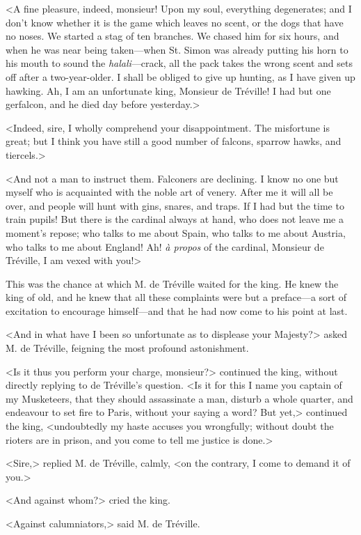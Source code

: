 <A fine pleasure, indeed, monsieur! Upon my soul, everything degenerates; and I don't know whether it is the game which leaves no scent, or the dogs that have no noses. We started a stag of ten branches. We chased him for six hours, and when he was near being taken---when St. Simon was already putting his horn to his mouth to sound the \textit{halali}---crack, all the pack takes the wrong scent and sets off after a two-year-older. I shall be obliged to give up hunting, as I have given up hawking. Ah, I am an unfortunate king, Monsieur de Tréville! I had but one gerfalcon, and he died day before yesterday.> 

<Indeed, sire, I wholly comprehend your disappointment. The misfortune is great; but I think you have still a good number of falcons, sparrow hawks, and tiercels.> 

<And not a man to instruct them. Falconers are declining. I know no one but myself who is acquainted with the noble art of venery. After me it will all be over, and people will hunt with gins, snares, and traps. If I had but the time to train pupils! But there is the cardinal always at hand, who does not leave me a moment's repose; who talks to me about Spain, who talks to me about Austria, who talks to me about England! Ah! \textit{à propos} of the cardinal, Monsieur de Tréville, I am vexed with you!> 

This was the chance at which M. de Tréville waited for the king. He knew the king of old, and he knew that all these complaints were but a preface---a sort of excitation to encourage himself---and that he had now come to his point at last. 

<And in what have I been so unfortunate as to displease your Majesty?> asked M. de Tréville, feigning the most profound astonishment. 

<Is it thus you perform your charge, monsieur?> continued the king, without directly replying to de Tréville's question. <Is it for this I name you captain of my Musketeers, that they should assassinate a man, disturb a whole quarter, and endeavour to set fire to Paris, without your saying a word? But yet,> continued the king, <undoubtedly my haste accuses you wrongfully; without doubt the rioters are in prison, and you come to tell me justice is done.> 

<Sire,> replied M. de Tréville, calmly, <on the contrary, I come to demand it of you.> 

<And against whom?> cried the king. 

<Against calumniators,> said M. de Tréville. 

